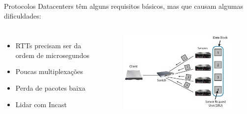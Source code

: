 \documentclass[aspectratio=169]{beamer}
\begin{document}
    
    \begin{frame}{Protocolos}
    \huge
    Datacenters têm alguns requisitos básicos,  mas que causam algumas dificuldades:
   
      \begin{columns}    
          \begin{itemize}
              \large            
              \item
                  RTTs precisam ser da ordem de microsegundos
          
              \item
                  Poucas multiplexações
          
               \item
                  Perda de pacotes baixa
                \item
                    Lidar com Incast
                    
               
                          
          \end{itemize}
     \begin{figure}[ht]    
                     \includegraphics[scale=0.3]{problems.jpg}
                     
                    
                     \label{fig:problems}
                 \end{figure}
    
    
    \end{columns}
    
     
    
    \end{frame}
    
\end{document}
